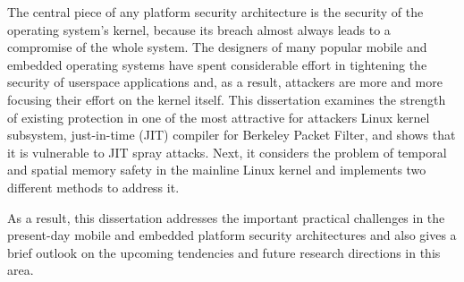 The central piece of any platform security architecture is the security of the operating system's kernel, because its breach almost always leads to a compromise of the whole system. The designers of many popular mobile and embedded operating systems have spent considerable effort in tightening the security of userspace applications and, as a result, attackers are more and more focusing their effort on the kernel itself. This dissertation examines the strength of existing protection in one of the most attractive for attackers Linux kernel subsystem, just-in-time (JIT) compiler for Berkeley Packet Filter, and shows that it is vulnerable to JIT spray attacks. Next, it considers the problem of temporal and spatial memory safety in the mainline Linux kernel and implements two different methods to address it.   

As a result, this dissertation addresses the important practical challenges in the present-day mobile and embedded platform security architectures and also gives a brief outlook on the upcoming tendencies and future research directions in this area.  


